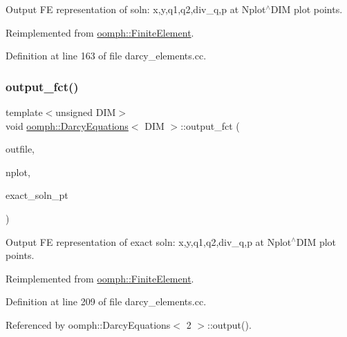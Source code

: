 Output FE representation of soln\+: x,y,q1,q2,div\+\_\+q,p at Nplot$^\wedge$\+D\+IM plot points. 



Reimplemented from \hyperlink{classoomph_1_1FiniteElement_afa9d9b2670f999b43e6679c9dd28c457}{oomph\+::\+Finite\+Element}.



Definition at line 163 of file darcy\+\_\+elements.\+cc.

\mbox{\label{classoomph_1_1DarcyEquations_a2b072036a9fba0dfcf682f9a5d2fa2b6}} 
\subsubsection{\texorpdfstring{output\+\_\+fct()}{output\_fct()}}
{\footnotesize\ttfamily template$<$unsigned D\+IM$>$ \\
void \hyperlink{classoomph_1_1DarcyEquations}{oomph\+::\+Darcy\+Equations}$<$ D\+IM $>$\+::output\+\_\+fct (\begin{DoxyParamCaption}\item[{std\+::ostream \&}]{outfile,  }\item[{const unsigned \&}]{nplot,  }\item[{\hyperlink{classoomph_1_1FiniteElement_a690fd33af26cc3e84f39bba6d5a85202}{Finite\+Element\+::\+Steady\+Exact\+Solution\+Fct\+Pt}}]{exact\+\_\+soln\+\_\+pt }\end{DoxyParamCaption})\hspace{0.3cm}{\ttfamily [virtual]}}



Output FE representation of exact soln\+: x,y,q1,q2,div\+\_\+q,p at Nplot$^\wedge$\+D\+IM plot points. 



Reimplemented from \hyperlink{classoomph_1_1FiniteElement_a22b695c714f60ee6cd145be348042035}{oomph\+::\+Finite\+Element}.



Definition at line 209 of file darcy\+\_\+elements.\+cc.



Referenced by oomph\+::\+Darcy\+Equations$<$ 2 $>$\+::output().

\mbox{\label{classoomph_1_1DarcyEquations_a386bf5d62e4ad7dc8df9e0a55bc9d158}} 
